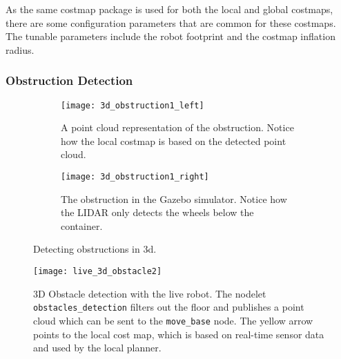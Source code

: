 As the same costmap package is used for both the local and global costmaps, there are some configuration parameters that are common for these costmaps. The tunable parameters include the robot footprint and the costmap inflation radius. 

\subsubsection{Obstruction Detection}


\begin{figure}
	\centering
	\begin{subfigure}[b]{0.53\textwidth}
		\texttt{[image: 3d\_obstruction1\_left]}
		\caption{A point cloud representation of the obstruction. Notice how the local costmap is based on the detected point cloud.}
		\label{fig:device_select}
	\end{subfigure}
		\begin{subfigure}[b]{0.45\textwidth}
			\texttt{[image: 3d\_obstruction1\_right]}
			\caption{The obstruction in the Gazebo simulator. Notice how the LIDAR only detects the wheels below the container.}
			\label{fig:bt_request}
		\end{subfigure}
	\caption{\label{fig:3d_obstruction1}Detecting obstructions in 3d.}
\end{figure}

\begin{figure}[h]
	\centering
	\texttt{[image: live\_3d\_obstacle2]}
	\caption{3D Obstacle detection with the live robot. The nodelet \texttt{obstacles\_detection} filters out the floor and publishes a point cloud which can be sent to the \texttt{move\_base} node. The yellow arrow points to the local cost map, which is based on real-time sensor data and used by the local planner.}
	\label{fig:live_3d_obstacle2}
\end{figure}